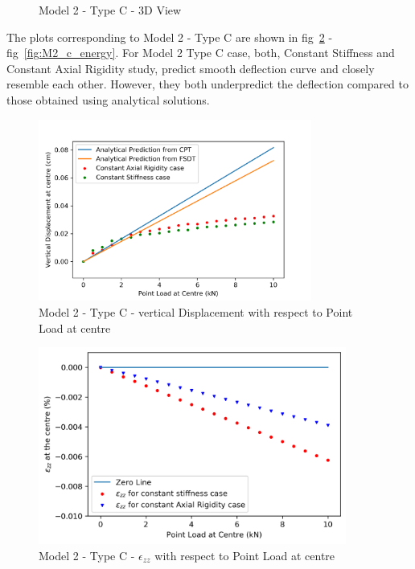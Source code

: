 \begin{figure}[!htbp]
\begin{minipage}{0.3\textwidth}
    \caption{Model 2 - Type C - 3D View}
    \label{fig:M2_c_3D}
\end{minipage}
\end{figure}

The plots corresponding to Model 2 - Type C are shown in fig~\ref{fig:M2_c_plt} - fig~\ref{fig:M2_c_energy}. For Model 2 Type C case, both, Constant Stiffness and Constant Axial Rigidity study, predict smooth deflection curve and closely resemble each other. However, they both underpredict the deflection compared to those obtained using analytical solutions. 

\begin{figure}[!htbp]
    \centering
    \includegraphics[width = 0.8\textwidth]{Figures/M2_c_plt.png}
    \caption{Model 2 - Type C - vertical Displacement with respect to Point Load at centre}
    \label{fig:M2_c_plt}
\end{figure}

\begin{figure}[!htbp]
    \centering
    \includegraphics[width = 0.9\textwidth]{Figures/M2_c_strain.png}
    \caption{Model 2 - Type C - $\epsilon_{zz}$ with respect to Point Load at centre}
    \label{fig:M2_c_strain_plt}
\end{figure}

